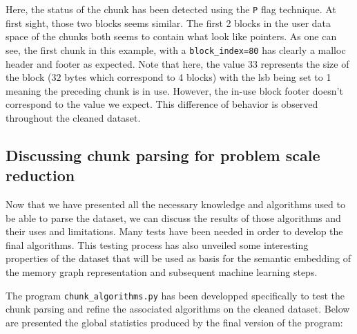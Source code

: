     Here, the status of the chunk has been detected using the \texttt{P} flag technique. At first sight, those two blocks seems similar. The first 2 blocks in the user data space of the chunks both seems to contain what look like pointers. As one can see, the first chunk in this example, with a \texttt{block\_index=80} has clearly a malloc header and footer as expected. Note that here, the value $33$ represents the size of the block ($32$ bytes which correspond to 4 blocks) with the \acrshort{lsb} being set to 1 meaning the preceding chunk is in use. However, the in-use block footer doesn't correspond to the value we expect. This difference of behavior is observed throughout the cleaned dataset. 

    \subsection{Discussing chunk parsing for problem scale reduction}
    Now that we have presented all the necessary knowledge and algorithms used to be able to parse the dataset, we can discuss the results of those algorithms and their uses and limitations. Many tests have been needed in order to develop the final algorithms. This testing process has also unveiled some interesting properties of the dataset that will be used as basis for the semantic embedding of the memory graph representation and subsequent machine learning steps.

    The program \texttt{chunk\_algorithms.py} has been developped specifically to test the chunk parsing and refine the associated algorithms on the cleaned dataset. Below are presented the global statistics produced by the final version of the program:


